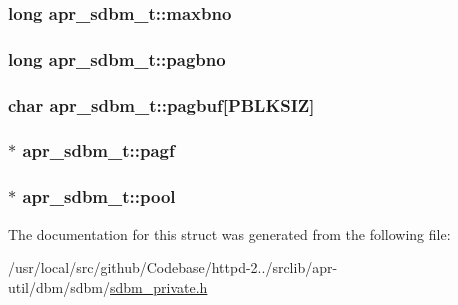 \subsubsection[{\texorpdfstring{maxbno}{maxbno}}]{\setlength{\rightskip}{0pt plus 5cm}long apr\+\_\+sdbm\+\_\+t\+::maxbno}\hypertarget{structapr__sdbm__t_a50333e4412f821cc24de74404b5bf633}{}\label{structapr__sdbm__t_a50333e4412f821cc24de74404b5bf633}
\subsubsection[{\texorpdfstring{pagbno}{pagbno}}]{\setlength{\rightskip}{0pt plus 5cm}long apr\+\_\+sdbm\+\_\+t\+::pagbno}\hypertarget{structapr__sdbm__t_a45cca39713db088a264b6b2eea518a7f}{}\label{structapr__sdbm__t_a45cca39713db088a264b6b2eea518a7f}
\subsubsection[{\texorpdfstring{pagbuf}{pagbuf}}]{\setlength{\rightskip}{0pt plus 5cm}char apr\+\_\+sdbm\+\_\+t\+::pagbuf\mbox{[}{\bf P\+B\+L\+K\+S\+IZ}\mbox{]}}\hypertarget{structapr__sdbm__t_a026d7cdf20222070455f73415342004f}{}\label{structapr__sdbm__t_a026d7cdf20222070455f73415342004f}
\subsubsection[{\texorpdfstring{pagf}{pagf}}]{$\ast$ apr\+\_\+sdbm\+\_\+t\+::pagf}\hypertarget{structapr__sdbm__t_a4641e6dc78427953a65e325a3efe1586}{}\label{structapr__sdbm__t_a4641e6dc78427953a65e325a3efe1586}
\subsubsection[{\texorpdfstring{pool}{pool}}]{$\ast$ apr\+\_\+sdbm\+\_\+t\+::pool}\hypertarget{structapr__sdbm__t_a34ad1ed73a9ed80dc407fc739206c507}{}\label{structapr__sdbm__t_a34ad1ed73a9ed80dc407fc739206c507}


The documentation for this struct was generated from the following file\+:\begin{DoxyCompactItemize}
\item 
/usr/local/src/github/\+Codebase/httpd-\/2../srclib/apr-\/util/dbm/sdbm/\hyperlink{sdbm__private_8h}{sdbm\+\_\+private.\+h}\end{DoxyCompactItemize}
